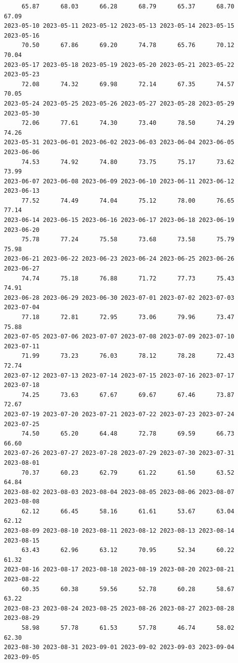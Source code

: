 \documentclass[
  letterpaper,
  DIV=11,
  numbers=noendperiod]{scrartcl}
\begin{document}
\begin{verbatim}
     65.87      68.03      66.28      68.79      65.37      68.70      67.09 
2023-05-10 2023-05-11 2023-05-12 2023-05-13 2023-05-14 2023-05-15 2023-05-16 
     70.50      67.86      69.20      74.78      65.76      70.12      70.04 
2023-05-17 2023-05-18 2023-05-19 2023-05-20 2023-05-21 2023-05-22 2023-05-23 
     72.08      74.32      69.98      72.14      67.35      74.57      70.05 
2023-05-24 2023-05-25 2023-05-26 2023-05-27 2023-05-28 2023-05-29 2023-05-30 
     72.06      77.61      74.30      73.40      78.50      74.29      74.26 
2023-05-31 2023-06-01 2023-06-02 2023-06-03 2023-06-04 2023-06-05 2023-06-06 
     74.53      74.92      74.80      73.75      75.17      73.62      73.99 
2023-06-07 2023-06-08 2023-06-09 2023-06-10 2023-06-11 2023-06-12 2023-06-13 
     77.52      74.49      74.04      75.12      78.00      76.65      77.14 
2023-06-14 2023-06-15 2023-06-16 2023-06-17 2023-06-18 2023-06-19 2023-06-20 
     75.78      77.24      75.58      73.68      73.58      75.79      75.98 
2023-06-21 2023-06-22 2023-06-23 2023-06-24 2023-06-25 2023-06-26 2023-06-27 
     74.74      75.18      76.88      71.72      77.73      75.43      74.91 
2023-06-28 2023-06-29 2023-06-30 2023-07-01 2023-07-02 2023-07-03 2023-07-04 
     77.18      72.81      72.95      73.06      79.96      73.47      75.88 
2023-07-05 2023-07-06 2023-07-07 2023-07-08 2023-07-09 2023-07-10 2023-07-11 
     71.99      73.23      76.03      78.12      78.28      72.43      72.74 
2023-07-12 2023-07-13 2023-07-14 2023-07-15 2023-07-16 2023-07-17 2023-07-18 
     74.25      73.63      67.67      69.67      67.46      73.87      72.67 
2023-07-19 2023-07-20 2023-07-21 2023-07-22 2023-07-23 2023-07-24 2023-07-25 
     74.50      65.20      64.48      72.78      69.59      66.73      66.60 
2023-07-26 2023-07-27 2023-07-28 2023-07-29 2023-07-30 2023-07-31 2023-08-01 
     70.37      60.23      62.79      61.22      61.50      63.52      64.84 
2023-08-02 2023-08-03 2023-08-04 2023-08-05 2023-08-06 2023-08-07 2023-08-08 
     62.12      66.45      58.16      61.61      53.67      63.04      62.12 
2023-08-09 2023-08-10 2023-08-11 2023-08-12 2023-08-13 2023-08-14 2023-08-15 
     63.43      62.96      63.12      70.95      52.34      60.22      61.32 
2023-08-16 2023-08-17 2023-08-18 2023-08-19 2023-08-20 2023-08-21 2023-08-22 
     60.35      60.38      59.56      52.78      60.28      58.67      63.22 
2023-08-23 2023-08-24 2023-08-25 2023-08-26 2023-08-27 2023-08-28 2023-08-29 
     58.98      57.78      61.53      57.78      46.74      58.02      62.30 
2023-08-30 2023-08-31 2023-09-01 2023-09-02 2023-09-03 2023-09-04 2023-09-05 

\end{verbatim}
\end{document}
